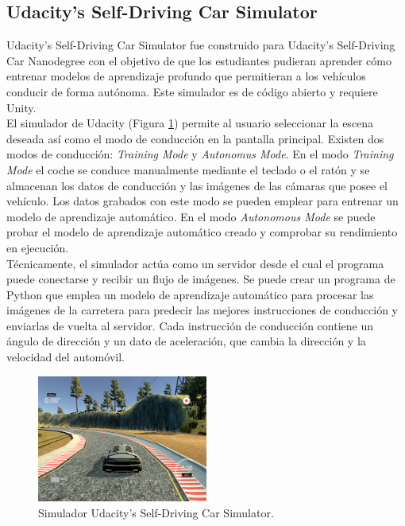 \subsection{Udacity's Self-Driving Car Simulator}

Udacity's Self-Driving Car Simulator \cite{udacity-data} \cite{udacity-sim} fue construido para Udacity's Self-Driving Car Nanodegree con el objetivo de que los estudiantes pudieran aprender cómo entrenar modelos de aprendizaje profundo que permitieran a los vehículos conducir de forma autónoma. Este simulador es de código abierto y requiere Unity.\\

El simulador de Udacity (Figura \ref{fig.udacity-sim}) permite al usuario seleccionar la escena deseada así como el modo de conducción en la pantalla principal. Existen dos modos de conducción: \textit{Training Mode} y \textit{Autonomus Mode}. En el modo \textit{Training Mode} el coche se conduce manualmente mediante el teclado o el ratón y se almacenan los datos de conducción y las imágenes de las cámaras que posee el vehículo. Los datos grabados con este modo se pueden emplear para entrenar un modelo de aprendizaje automático. En el modo \textit{Autonomous Mode} se puede probar el modelo de aprendizaje automático creado y comprobar su rendimiento en ejecución.\\

Técnicamente, el simulador actúa como un servidor desde el cual el programa puede conectarse y recibir un flujo de imágenes. Se puede crear un programa de Python que emplea un modelo de aprendizaje automático para procesar las imágenes de la carretera para predecir las mejores instrucciones de conducción y enviarlas de vuelta al servidor. Cada instrucción de conducción contiene un ángulo de dirección y un dato de aceleración, que cambia la dirección y la velocidad del automóvil.

\begin{figure}
\begin{center}
	\includegraphics[width=0.5\textwidth]{figures/Estado_arte/udacity.png}
   \caption{Simulador Udacity's Self-Driving Car Simulator.}
	\label{fig.udacity-sim}
\end{center}
\end{figure}


